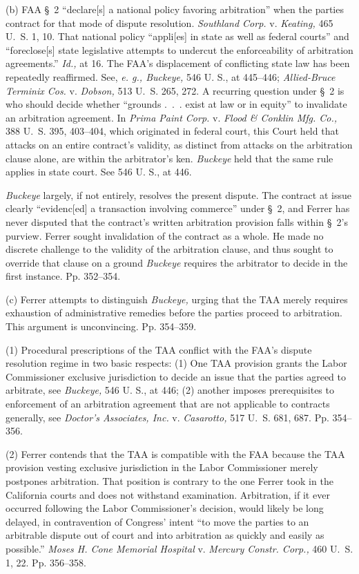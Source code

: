   (b) FAA \S~2 ``declare[s] a national policy favoring arbitration''
when the parties contract for that mode of dispute resolution.
\emph{Southland Corp.} v. \emph{Keating,} 465 U.~S. 1, 10. That national
policy ``appli[es] in state \newpage  as well as federal courts''
and ``foreclose[s] state legislative attempts to undercut the
enforceability of arbitration agreements.'' \emph{Id.,} at 16. The FAA's
displacement of conflicting state law has been repeatedly reaffirmed.
See, \emph{e. g., Buckeye,} 546 U. S., at 445--446; \emph{Allied-Bruce}
\emph{Terminix Cos.} v. \emph{Dobson,} 513 U.~S. 265, 272. A recurring
question under \S~2 is who should decide whether ``grounds .~.~.
exist at law or in equity'' to invalidate an arbitration agreement. In
\emph{Prima Paint Corp.} v. \emph{Flood \& Conklin Mfg. Co.,} 388 U.~S. 395,
403--404, which originated in federal court, this Court held that
attacks on an entire contract's validity, as distinct from attacks
on the arbitration clause alone, are within the arbitrator's ken.
\emph{Buckeye} held that the same rule applies in state court. See 546 U.
S., at 446.

  \emph{Buckeye} largely, if not entirely, resolves the present dispute.
The contract at issue clearly ``evidenc[ed] a transaction involving
commerce'' under \S~2, and Ferrer has never disputed that the
contract's written arbitration provision falls within \S~2's
purview. Ferrer sought invalidation of the contract as a whole. He made
no discrete challenge to the validity of the arbitration clause, and
thus sought to override that clause on a ground \emph{Buckeye} requires the
arbitrator to decide in the first instance. Pp. 352--354.

  (c) Ferrer attempts to distinguish \emph{Buckeye,} urging that the
TAA merely requires exhaustion of administrative remedies before the
parties proceed to arbitration. This argument is unconvincing. Pp.
354--359.

  (1) Procedural prescriptions of the TAA conflict with the FAA's
dispute resolution regime in two basic respects: (1) One TAA provision
grants the Labor Commissioner exclusive jurisdiction to decide an
issue that the parties agreed to arbitrate, see \emph{Buckeye,} 546 U.
S., at 446; (2) another imposes prerequisites to enforcement of an
arbitration agreement that are not applicable to contracts generally,
see \emph{Doctor's Associates, Inc.} v. \emph{Casarotto,} 517 U.~S. 681,
687. Pp. 354--356.

  (2) Ferrer contends that the TAA is compatible with the FAA
because the TAA provision vesting exclusive jurisdiction in the
Labor Commissioner merely postpones arbitration. That position is
contrary to the one Ferrer took in the California courts and does not
withstand examination. Arbitration, if it ever occurred following
the Labor Commissioner's decision, would likely be long delayed,
in contravention of Congress' intent ``to move the parties to
an arbitrable dispute out of court and into arbitration as quickly
and easily as possible.'' \emph{Moses H. Cone Memorial Hospital} v.
\emph{Mercury Constr. Corp.,} 460 U.~S. 1, 22. Pp. 356--358.


